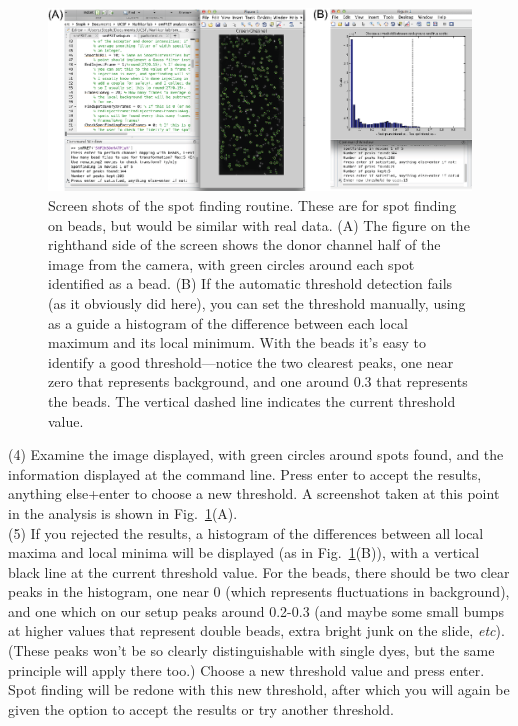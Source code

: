 \documentclass[11pt]{article}
\begin{document}
\begin{figure}
\begin{center}
\includegraphics[width=6.5in]{ScreenShots/BeadFindScreenShot.eps}
\caption{Screen shots of the spot finding routine. These are for spot finding on beads, but would be similar with real data. (A) The figure on the righthand side of the screen shows the donor channel half of the image from the camera, with green circles around each spot identified as a bead. (B) If the automatic threshold detection fails (as it obviously did here), you can set the threshold manually, using as a guide a histogram of the difference between each local maximum and its local minimum.  With the beads it's easy to identify a good threshold---notice the two clearest peaks, one near zero that represents background, and one around 0.3 that represents the beads. The vertical dashed line indicates the current threshold value. }
\label{fig:BeadFindShot}
\end{center}
\end{figure}

\noindent (4) Examine the image displayed, with green circles around spots found, and the information displayed at the command line. Press enter to accept the results, anything else+enter to choose a new threshold.  A screenshot taken at this point in the analysis is shown in Fig.~\ref{fig:BeadFindShot}(A).\\

\noindent (5) If you rejected the results, a histogram of the differences between all local maxima and local minima will be displayed (as in Fig.~\ref{fig:BeadFindShot}(B)), with a vertical black line at the current threshold value.  For the beads, there should be two clear peaks in the histogram, one near 0 (which represents fluctuations in background), and one which on our setup peaks around 0.2-0.3 (and maybe some small bumps at higher values that represent double beads, extra bright junk on the slide, {\it etc}). (These peaks won't be so clearly distinguishable with single dyes, but the same principle will apply there too.) Choose a new threshold value and press enter.  Spot finding will be redone with this new threshold, after which you will again be given the option to accept the results or try another threshold.
\end{document}
